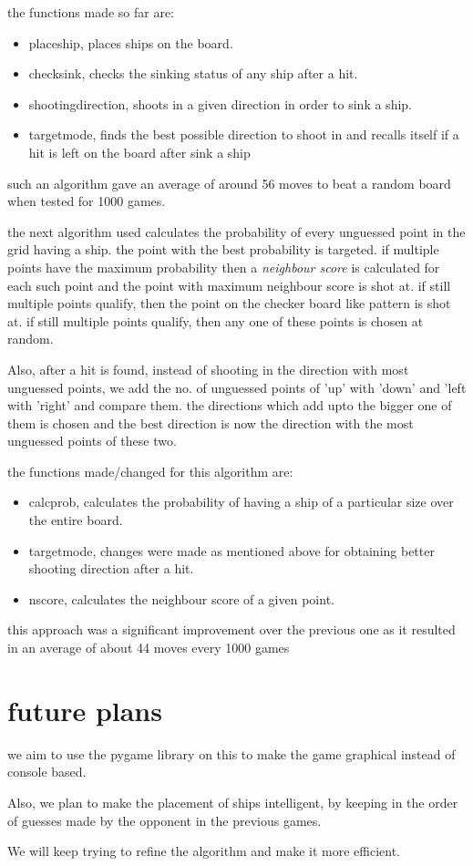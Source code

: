 \documentclass{article}
\begin{document}
	the functions made so far are:
	\begin{itemize}
   		
   		\item placeship, places ships on the board.
   		\item checksink, checks the sinking status of any ship after a hit.
   		\item shootingdirection, shoots in a given direction in order to sink a ship.
   		\item targetmode, finds the best possible direction to shoot in and recalls itself if a hit is left on the board after sink a ship
	
	\end{itemize}
	
	such an algorithm gave an average of around 56 moves to beat a random board when tested for 1000 games.
	
	the next algorithm used calculates the probability of every unguessed point in the grid having a ship. the point with the best probability is targeted. if multiple points have the maximum probability then a \textit{neighbour score} is calculated for each such point and the point with maximum neighbour score is shot at. if still multiple points qualify, then the point on the checker board like pattern is shot at. if still multiple points qualify, then any one of these points is chosen at random.
	
	Also, after a hit is found, instead of shooting in the direction with most unguessed points, we add the no. of unguessed points of 'up' with 'down' and 'left with 'right' and compare them. the directions which add upto the bigger one of them is chosen and the best direction is now the direction with the most unguessed points of these two.
	
	the functions made/changed for this algorithm are:
	\begin{itemize}
	
		\item calcprob, calculates the probability of having a ship of a particular size over the entire board.
		\item targetmode, changes were made as mentioned above for obtaining better shooting direction after a hit.
		\item nscore, calculates the neighbour score of a given point.
	\end{itemize}
	
	this approach was a significant improvement over the previous one as it resulted in an average of about 44 moves every 1000 games
   
   \section{future plans}
   we aim to use the pygame library on this to make the game graphical instead of console based.
  
  Also, we plan to make the placement of ships intelligent, by keeping in the order of guesses made by the opponent in the previous games.
  
  We will keep trying to refine the algorithm and make it more efficient.
\end{document}
